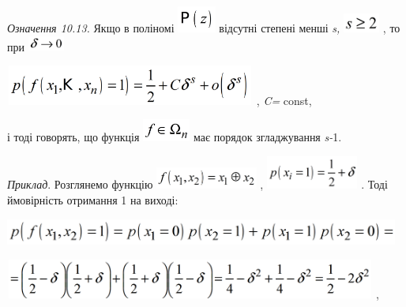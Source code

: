 \documentclass[a4paper]{article}
\newcounter{}
\begin{document}
\textit{Означення 10.13.} Якщо в поліномі 
\includegraphics[width=0.4945in,height=0.3429in]{crypt-img/crypt-img246.png} 
відсутні степені менші \textit{s}\textit{, }
\includegraphics[width=0.4701in,height=0.248in]{crypt-img/crypt-img247.png} ,
то при 
\includegraphics[width=0.472in,height=0.1937in]{crypt-img/crypt-img248.png} 

{\centering
 \includegraphics[width=3.2417in,height=0.5193in]{crypt-img/crypt-img249.png} , 
\textit{C}\textit{=} const,
\par}

і тоді говорять, що функція 
\includegraphics[width=0.6173in,height=0.2909in]{crypt-img/crypt-img250.png} 
має порядок згладжування  \textit{s}\textit{{}-}1.

\textit{Приклад}. Розглянемо функцію
\includegraphics[width=1.3193in,height=0.278in]{crypt-img/crypt-img251.png} , 
\includegraphics[width=1.1937in,height=0.4307in]{crypt-img/crypt-img252.png} .
Тоді ймовірність отримання 1 на виході:

{\centering 
\includegraphics[width=5.1161in,height=0.3429in]{crypt-img/crypt-img253.png}
\par}

{\centering
 \includegraphics[width=4.8161in,height=0.5091in]{crypt-img/crypt-img254.png} ,
\par}
\end{document}
